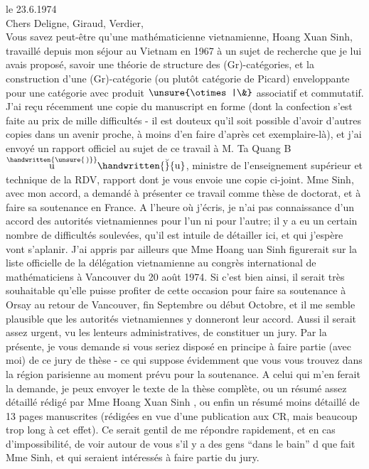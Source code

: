 
\noindent\hfill{} le 23.6.1974\\

Chers Deligne, Giraud, Verdier,\\

Vous savez peut-être qu'une mathématicienne vietnamienne, Hoang Xuan Sinh,  travaillé depuis mon séjour au Vietnam en 1967 à un sujet de recherche que je lui avais proposé, savoir une théorie de structure des (Gr)-catégories, et la construction d'une (Gr)-catégorie (ou plutôt catégorie de Picard) enveloppante pour une catégorie avec produit $\unsure{\otimes|\&}$ associatif et commutatif. J'ai reçu récemment une copie du manuscript en forme (dont la confection s'est faite au prix de mille difficultés - il est douteux qu'il soit possible d'avoir d'autres copies dans un avenir proche, à moins d'en faire d'après cet exemplaire-là), et j'ai envoyé un rapport officiel au sujet de ce travail à M. Ta Quang B$\overset{\handwritten{\unsure{\,)}}}{\mathrm{u}}\handwritten{\breve}{\mathrm{u}}$, ministre de l'enseignement supérieur et technique de la RDV, rapport dont je vous envoie une copie ci-joint. Mme Sinh, avec mon accord, a demandé à présenter ce travail comme thèse de doctorat, et à faire sa soutenance en France. A l'heure où j'écris, je n'ai pas connaissance d'un accord des autorités vietnamiennes pour l'un ni pour l'autre; il y a eu un certain nombre de difficultés soulevées, qu'il est intuile de détailler ici, et qui j'espère vont s'aplanir. J'ai appris par ailleurs que Mme Hoang uan Sinh figurerait sur la liste officielle de la délégation vietnamienne au congrès international de mathématiciens à Vancouver du 20 août 1974. Si c'est bien ainsi, il serait très souhaitable qu'elle puisse profiter de cette occasion pour faire sa soutenance à Orsay au retour de Vancouver, fin Septembre ou début Octobre, et il me semble plausible que les autorités vietnamiennes y donneront leur accord. Aussi il serait assez urgent, vu les lenteurs administratives, de constituer un jury. Par la présente, je vous demande si vous seriez disposé en principe à faire partie (avec moi) de ce jury de thèse - ce qui suppose évidemment que vous vous trouvez dans la région parisienne au moment prévu pour la soutenance. A celui qui m'en ferait la demande, je peux envoyer le texte de la thèse complète, ou un résumé assez détaillé rédigé par Mme Hoang Xuan Sinh , ou enfin un résumé moins détaillé de 13 pages manuscrites (rédigées en vue d'une publication aux CR, mais beaucoup trop long à cet effet). Ce serait gentil de me répondre rapidement, et en cas d'impossibilité, de voir autour de vous s'il y a des gens ``dans le bain'' d   que fait Mme Sinh, et qui seraient intéressés à faire partie du jury.
